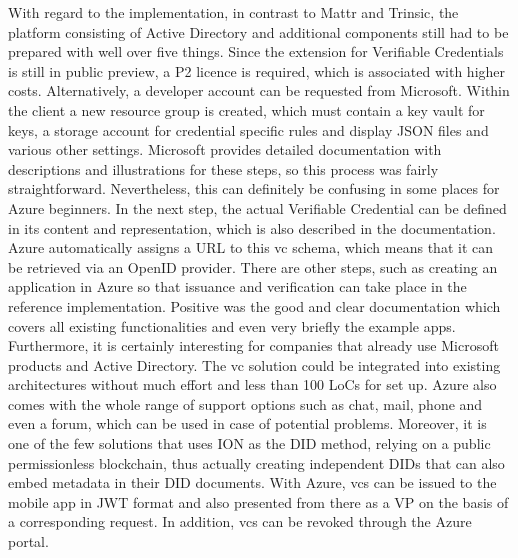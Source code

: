         With regard to the implementation, in contrast to Mattr and Trinsic, the platform consisting of Active Directory and additional components still had to be prepared with well over five things. Since the extension for Verifiable Credentials is still in public preview, a P2 licence is required, which is associated with higher costs. Alternatively, a developer account can be requested from Microsoft. Within the client a new resource group is created, which must contain a key vault for keys, a storage account for credential specific rules and display JSON files and various other settings. Microsoft provides detailed documentation with descriptions and illustrations for these steps, so this process was fairly straightforward. Nevertheless, this can definitely be confusing in some places for Azure beginners. In the next step, the actual Verifiable Credential can be defined in its content and representation, which is also described in the documentation. Azure automatically assigns a URL to this \ac{vc} schema, which means that it can be retrieved via an OpenID provider. There are other steps, such as creating an application in Azure so that issuance and verification can take place in the reference implementation. Positive was the good and clear documentation which covers all existing functionalities and even very briefly the example apps. Furthermore, it is certainly interesting for companies that already use Microsoft products and Active Directory. The \ac{vc} solution could be integrated into existing architectures without much effort and less than 100 LoCs for set up. Azure also comes with the whole range of support options such as chat, mail, phone and even a forum, which can be used in case of potential problems. Moreover, it is one of the few solutions that uses ION as the \ac{DID} method, relying on a public permissionless blockchain, thus actually creating independent \acp{DID} that can also embed metadata in their \ac{DID} documents. With Azure, \acp{vc} can be issued to the mobile app in JWT format and also presented from there as a \ac{VP} on the basis of a corresponding request. In addition, \acp{vc} can be revoked through the Azure portal.  
    

